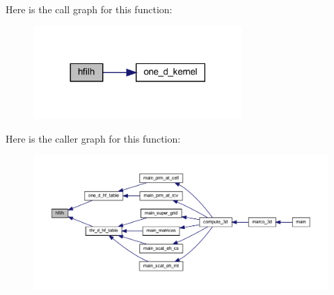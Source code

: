 Here is the call graph for this function\+:
\nopagebreak
\begin{figure}[H]
\begin{center}
\leavevmode
\includegraphics[width=225pt]{Marco_8f90_a74a15aabfd889793f141e6d8ac9592c4_cgraph}
\end{center}
\end{figure}
Here is the caller graph for this function\+:
\nopagebreak
\begin{figure}[H]
\begin{center}
\leavevmode
\includegraphics[width=350pt]{Marco_8f90_a74a15aabfd889793f141e6d8ac9592c4_icgraph}
\end{center}
\end{figure}
\mbox{\label{Marco_8f90_a480d736c8998d27f049a30b17c5abb11}} 
